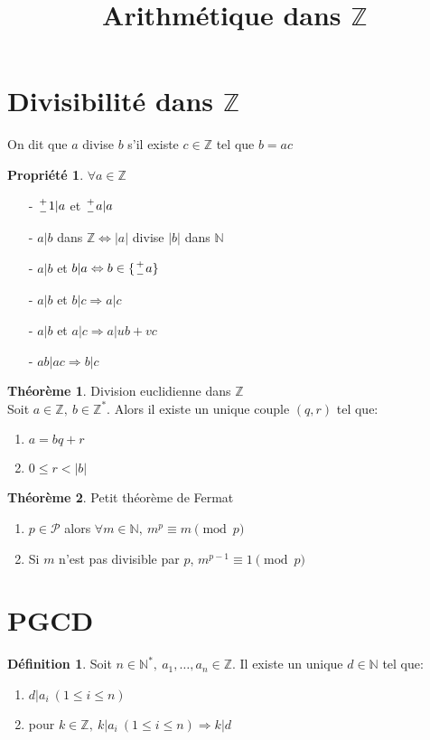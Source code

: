 \documentclass[fleqn]{article}
\title{Arithm\'etique dans $\mathbb{Z}$}
\date{}
\theoremstyle{definition} \newtheorem*{defi}{D\'efinition}
\theoremstyle{definition} \newtheorem*{theo}{Th\'eor\`eme}
\theoremstyle{definition} \newtheorem*{coro}{Corollaire}
\theoremstyle{remark} \newtheorem*{rqs}{Remarques}
\theoremstyle{definition} \newtheorem*{prop}{Propri\'et\'e}
\newcommand*{\bfrac}[2]{\genfrac{}{}{0pt}{}{#1}{#2}}
\begin{document}
\maketitle

\section{Divisibilit\'e dans $\mathbb{Z}$}
On dit que $a$ divise $b$ s'il existe $c \in \mathbb{Z}$ tel que $b=ac$
\begin{prop} $\forall a \in \mathbb{Z}$
	\begin{enumerate}
		\item [-] $\bfrac{+}{-} 1 | a$ et $\bfrac{+}{-} a | a$
		\item [-] $a | b$ dans $\mathbb{Z} \Leftrightarrow |a|$ divise $|b|$ dans $\mathbb{N}$
		\item [-] $a | b$ et $b | a \Leftrightarrow b \in \{\bfrac{+}{-} a\}$
		\item [-] $a|b$ et $b|c \Rightarrow a | c$
		\item [-] $a|b$ et $a|c \Rightarrow a| ub + vc$
		\item [-] $ab |ac \Rightarrow b|c$
	\end{enumerate}
\end{prop}

\begin{theo} Division euclidienne dans $\mathbb{Z}$ \\
Soit $a \in \mathbb{Z},\ b \in \mathbb{Z}^*$. Alors il existe un unique couple $(q,r)$ tel que:
\begin{enumerate}
	\item $a = bq + r$
	\item $0 \leq r < |b|$
\end{enumerate}
\end{theo}

\begin{theo} Petit th\'eor\`eme de Fermat
	\begin{enumerate}
		\item $p \in \mathcal{P}$ alors $\forall m \in \mathbb{N},\ m^p \equiv m \pmod{p}$
		\item Si $m$ n'est pas divisible par $p$, $m^{p-1} \equiv 1 \pmod{p}$
	\end{enumerate}
\end{theo}

\section{PGCD}
\begin{defi}
	Soit $n \in \mathbb{N}^*,\ a_1, \hdots, a_n \in \mathbb{Z}$. Il existe un unique $ d \in \mathbb{N}$ tel que:
	\begin{enumerate}
		\item $d | a_i\ (1 \leq i \leq n)$
		\item pour $k \in \mathbb{Z},\ k | a_i\ (1 \leq i \leq n) \Rightarrow k | d$
	\end{enumerate}
\end{defi}
\end{document}
